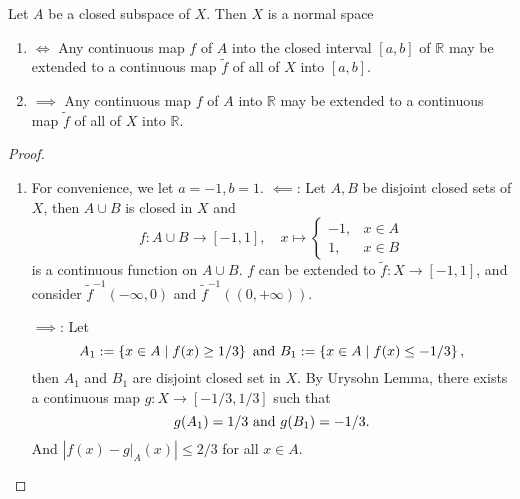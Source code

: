 \begin{theorem}
  Let \( A \) be a closed subspace of \( X \).
  Then \( X \) is a normal space
  \begin{enumerate}
    \item \( \iff \) Any continuous map \( f \) of \( A \) into the closed interval \( [a, b] \) of \( \mathbb{R} \) may be extended to a continuous map \( \tilde{f} \) of all of \( X \) into \( [a, b] \).
    \item \( \implies \) Any continuous map \( f \) of \( A \) into \( \mathbb{R} \) may be extended to a continuous map \( \tilde{f} \) of all of \( X \) into \( \mathbb{R} \).
  \end{enumerate}
\end{theorem}
\begin{proof}
  \begin{enumerate}
    \item For convenience, we let \( a = -1, b = 1 \).
      \( \impliedby \): Let \( A, B \) be disjoint closed sets of \( X \), then \( A \cup B \) is closed in \( X \) and
      \[
        f: A \cup B \to [-1, 1],\quad x \mapsto \left\lbrace \begin{array}{ll}
          -1, & x \in A\\
          1, & x \in B
        \end{array} \right.
      \]
      is a continuous function on \( A \cup B \).
      \( f \) can be extended to \( \widetilde{f}: X \to [-1, 1] \), and consider \( \widetilde{f}^{-1}(-\infty, 0) \) and \( \widetilde{f}^{-1}((0, +\infty)) \).

      \( \implies \): Let
      \[
        A_1 := \left\lbrace x \in A \mid f(x) \geq 1 / 3 \right\rbrace \textmd{ and } B_1 := \left\lbrace x \in A \mid f(x) \leq - 1 / 3 \right\rbrace,
      \]
      then \( A_1 \) and \( B_1 \) are disjoint closed set in \( X \).
      By Urysohn Lemma, there exists a continuous map \( g: X \to [-1/3, 1/3] \) such that
      \[
        g(A_1) = 1 / 3 \textmd{ and } g(B_1) = -1 / 3.
      \]
      And \( \left\vert f(x) - \left. g \right\vert_A(x) \right\vert \leq 2 / 3 \) for all \( x \in A \).


\end{enumerate}
\end{proof}
